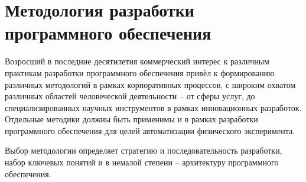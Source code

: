 \chapter{Методология разработки программного обеспечения}

Возросший в последние десятилетия коммерческий интерес к
различным практикам разработки программного обеспечения
привёл к формированию различных методологий в рамках
корпоративных процессов, с широким охватом различных областей
человеческой деятельности -- от сферы услуг, до специализированных
научных инструментов в рамках инновационных разработок.
Отдельные методики должны быть применимы и в рамках разработки
программного обеспечения для целей автоматизации физического
эксперимента.

Выбор методологии определяет стратегию и последовательность
разработки, набор ключевых понятий и в немалой степени -- архитектуру
программного обеспечения.












